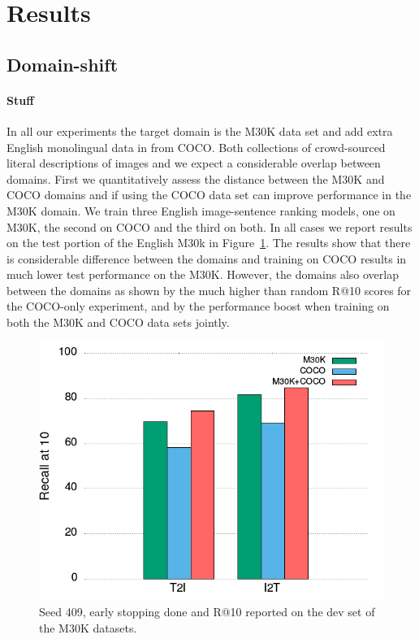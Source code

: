 \section{Results}

\subsection{Domain-shift}\label{sec:domain}


\paragraph{Stuff}
In all our experiments the target domain is the M30K data set and add extra
English monolingual data in from COCO. Both collections of crowd-sourced 
literal descriptions of images and we expect a considerable overlap between
domains. First we quantitatively assess the distance between the 
M30K and COCO domains and if using the COCO data set can improve
performance in the M30K domain. We train three English image-sentence 
ranking models, 
one on M30K, the second on 
COCO and the third on both. In all cases we report results on 
the test portion of the English M30k in Figure~\ref{fig:domain}. 
The results show that there is considerable 
difference between the domains and training on 
COCO results in much lower test performance on the M30K. 
However, the domains also overlap 
between the domains as shown by the much higher than 
random R@10 scores for the COCO-only experiment, and by the 
performance boost when training on both the M30K and COCO data sets jointly.\\

\begin{figure}
    \centering
    \includegraphics[scale=0.4]{assets/drift.png}
    \caption{Seed 409, early stopping done and R@10 reported on the dev set of the M30K datasets.}
    \label{fig:domain} 
\end{figure}

